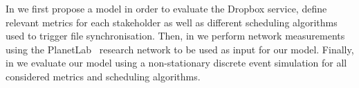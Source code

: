 In  we first propose a model in order to evaluate the Dropbox service, define relevant metrics for each stakeholder as well as different scheduling algorithms used to trigger file synchronisation.
Then, in  we perform network measurements using the PlanetLab~\cite{Chun2003} research network to be used as input for our model.
Finally, in  we evaluate our model using a non-stationary discrete event simulation for all considered metrics and scheduling algorithms.





